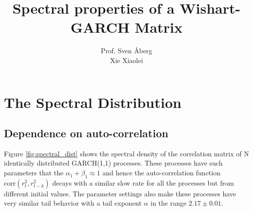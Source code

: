 \documentclass{article}
\title{Spectral properties of a Wishart-GARCH Matrix}
\author{Prof. Sven \AA berg\\
  Xie Xiaolei}
\begin{document}
\maketitle
\section{The Spectral Distribution}
\subsection{Dependence on auto-correlation}
Figure \ref{fig:spectral_dist} shows the spectral density of the
correlation matrix of N identically distributed GARCH(1,1)
processes. These processes have such parameters that 
the $\alpha_1 + \beta_1 \approx 1$ and hence the auto-correlation
function $\text{corr}(r^2_t, r^2_{t-k})$ decays with a similar slow
rate for all the processes but from different initial values. The
parameter settings also make these processes have very similar tail
behavior with a tail exponent $\alpha$ in the range $2.17 \pm 0.01$.
\end{document}
